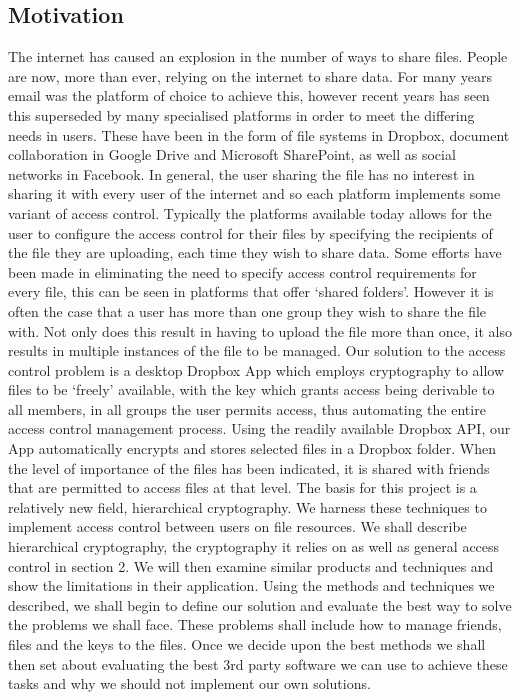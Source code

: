 \documentclass[12pt, titlepage]{article}
\begin{document}
\subsection{Motivation}
The internet has caused an explosion in the number of ways to share files. People are now, more than ever, relying on the internet to share data. For many years email was the platform of choice to achieve this, however recent years has seen this superseded by many specialised platforms in order to meet the differing needs in users. These have been in the form of file systems in Dropbox, document collaboration in Google Drive and Microsoft SharePoint, as well as social networks in Facebook. In general, the user sharing the file has no interest in sharing it with every user of the internet and so each platform implements some variant of access control. Typically the platforms available today allows for the user to configure the access control for their files by specifying the recipients of the file they are uploading, each time they wish to share data. Some efforts have been made in eliminating the need to specify access control requirements for every file, this can be seen in platforms that offer `shared folders'. However it is often the case that a user has more than one group they wish to share the file with. Not only does this result in having to upload the file more than once, it also results in multiple instances of the file to be managed. Our solution to the access control problem is a desktop Dropbox App which employs cryptography to allow files to be `freely' available, with the key which grants access being derivable to all members, in all groups the user permits access, thus automating the entire access control management process. Using the readily available Dropbox API, our App automatically encrypts and stores selected files in a Dropbox folder. When the level of importance of the files has been indicated, it is shared with friends that are permitted to access files at that level.
\newline
\newline \indent The basis for this project is a relatively new field, hierarchical cryptography. We harness these techniques to implement access control between users on file resources. We shall describe hierarchical cryptography, the cryptography it relies on as well as general access control in section 2. We will then examine similar products and techniques and show the limitations in their application.
\newline \indent Using the methods and techniques we described, we shall begin to define our solution and evaluate the best way to solve the problems we shall face. These problems shall include how to manage friends, files and the keys to the files. Once we decide upon the best methods we shall then set about evaluating the best 3rd party software we can use to achieve these tasks and why we should not implement our own solutions.
\end{document}
